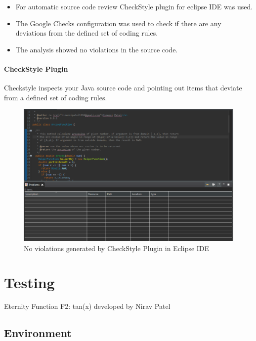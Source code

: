 \documentclass[11pt, english]{report}
\begin{document}
\begin{itemize}
    \item For automatic source code review CheckStyle\cite{checkstyle} plugin for eclipse IDE was used.
    \item The Google Checks configuration was used to check if there are any deviations from the defined set of coding rules.
    \item The analysis showed no violations in the source code.
\end{itemize}


\subsubsection{CheckStyle Plugin}

Checkstyle inspects your Java source code and pointing out items that deviate from a defined set of coding rules.

\begin{figure}[H]
  
  \includegraphics[width=1\textwidth]{codereview/googlecheckstyle.PNG}
  \centering
  \caption{ No violations generated by CheckStyle Plugin in Eclipse IDE
}
\end{figure}



\chapter{Testing}

Eternity Function F2: tan(x) developed by Nirav Patel

\section{Environment}
\end{document}
